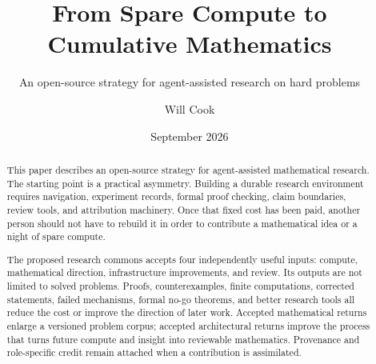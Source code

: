\documentclass[10pt]{article}
\title{From Spare Compute to Cumulative Mathematics}
\subtitle{An open-source strategy for agent-assisted research on hard problems}
\author{Will Cook}
\date{September 2026}
\begin{document}
\maketitle
{}
\normalsize

\begin{abstract}
This paper describes an open-source strategy for agent-assisted mathematical
research.  The starting point is a practical asymmetry.  Building a durable
research environment requires navigation, experiment records, formal proof
checking, claim boundaries, review tools, and attribution machinery.  Once
that fixed cost has been paid, another person should not have to rebuild it in
order to contribute a mathematical idea or a night of spare compute.

The proposed research commons accepts four independently useful inputs:
compute, mathematical direction, infrastructure improvements, and review.
Its outputs are not limited to solved problems.  Proofs, counterexamples,
finite computations, corrected statements, failed mechanisms, formal no-go
theorems, and better research tools all reduce the cost or improve the
direction of later work.  Accepted mathematical returns enlarge a versioned
problem corpus; accepted architectural returns improve the process that
turns future compute and insight into reviewable mathematics.  Provenance and
role-specific credit remain attached when a contribution is assimilated.


\end{abstract}
\end{document}
